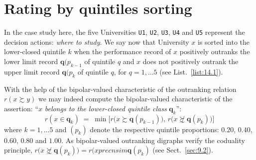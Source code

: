 \section{Rating by quintiles sorting}
\label{sec:14.4}

In the case study here, the five Universities \texttt{U1}, \texttt{U2}, \texttt{U3}, \texttt{U4} and \texttt{U5} represent the decision actions: \emph{where to study}. We say now that University $x$ is sorted into the lower-closed quintile $k$ when the performance record of $x$ positively outranks the lower limit record $\mathbf{q}(p_{k-1}$ of quintile $q$ and $x$ does not positively outrank the upper limit record $\mathbf{q}(p_{k}$ of quintile $q$, for $q = 1,...5$ (see List.~\vref{list:14.1}).

With the help of the bipolar-valued characteristic of the outranking relation $r(x \succsim y)$ we may indeed compute the bipolar-valued characteristic of the assertion: ``$x$ \emph{belongs to the lower-closed quintile class} $\mathbf{q}_k$'':
\begin{equation}\label{eq:14.1}
r(x \in \mathbf{q}_k) \; = \; \min \big[ r\big(x \succsim \mathbf{q}(p_{k-1})\big),\, r\big(x \not\succsim \mathbf{q}(p_{k})\big)\big]
\end{equation}
where $k = 1,...5$ and $(p_{k})$ denote the respective quintile proportions: $0.20$, $0.40$, $0.60$, $0.80$ and $1.00$. As bipolar-valued outranking digraphs verify the coduality principle, $r\big(x \not\succsim \mathbf{q}(p_{k}) \big) = r\big(x precnsim \mathbf{q}(p_{k})$ (see Sect.~\ref{sec:9.2}).

